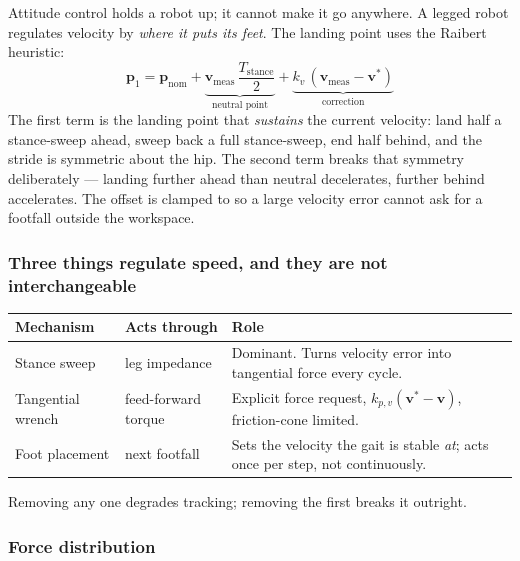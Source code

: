 \documentclass[11pt,a4paper]{article}
\begin{document}
Attitude control holds a robot up; it cannot make it go anywhere. A legged
robot regulates velocity by \emph{where it puts its feet}. The landing point
uses the Raibert heuristic:
\[
  \mathbf{p}_1 = \mathbf{p}_{\text{nom}}
    + \underbrace{\mathbf{v}_{\text{meas}}\,\frac{T_{\text{stance}}}{2}}_{\text{neutral point}}
    + \underbrace{k_v\,(\mathbf{v}_{\text{meas}} - \mathbf{v}^{*})}_{\text{correction}}
\]
The first term is the landing point that \emph{sustains} the current velocity:
land half a stance-sweep ahead, sweep back a full stance-sweep, end half behind,
and the stride is symmetric about the hip. The second term breaks that symmetry
deliberately --- landing further ahead than neutral decelerates, further behind
accelerates. The offset is clamped to  so a large
velocity error cannot ask for a footfall outside the workspace.

\subsubsection{Three things regulate speed, and they are not interchangeable}

\begin{center}\small
\begin{tabular}{@{}llp{}@{}}
\toprule
\textbf{Mechanism} & \textbf{Acts through} & \textbf{Role} \\
\midrule
Stance sweep     & leg impedance & Dominant. Turns velocity error into
                                   tangential force every cycle. \\
Tangential wrench & feed-forward torque & Explicit force request,
                                   $k_{p,v}(\mathbf{v}^{*}-\mathbf{v})$,
                                   friction-cone limited. \\
Foot placement   & next footfall & Sets the velocity the gait is stable
                                   \emph{at}; acts once per step, not
                                   continuously. \\
\bottomrule
\end{tabular}
\end{center}

Removing any one degrades tracking; removing the first breaks it outright.

\subsubsection{Force distribution}
\end{document}
